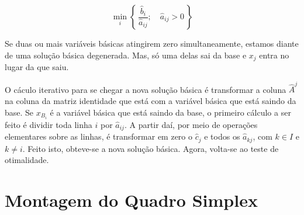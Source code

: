 \[
  \min_{i}  
  \left\{\, 
    \frac
    {
      \widehat{b}_i
    }
    {
      \widehat{a}_{ij}
    }; 
    \quad 
    \widehat{a}_{ij} > 0 
  \,\right\}
\]

\begin{obs}
  Se duas ou mais variáveis básicas atingirem zero simultaneamente, estamos 
  diante de uma solução básica degenerada.
  Mas, só uma delas sai da base e $ x_j $ entra no lugar da que saiu.
\end{obs}

O cáculo iterativo para se chegar a nova solução básica é transformar a coluna
$ \widehat{A}^j $ na coluna da matriz identidade que está com a variável básica
que está saindo da base.
Se $ x_{B_i} $ é a variável básica que está saindo da base, o primeiro cálculo
a ser feito é dividir toda linha $ i $ por $ \widehat{a}_{ij} $.
A partir daí, por meio de operações elementares sobre as linhas, é transformar
em zero o $ \widehat{c}_j $ e todos os $ \widehat{a}_{kj} $, com $ k \in I $ e 
$ k \neq i $.
Feito isto, obteve-se a nova solução básica.
Agora, volta-se ao teste de otimalidade.

\section{Montagem do Quadro Simplex} %
